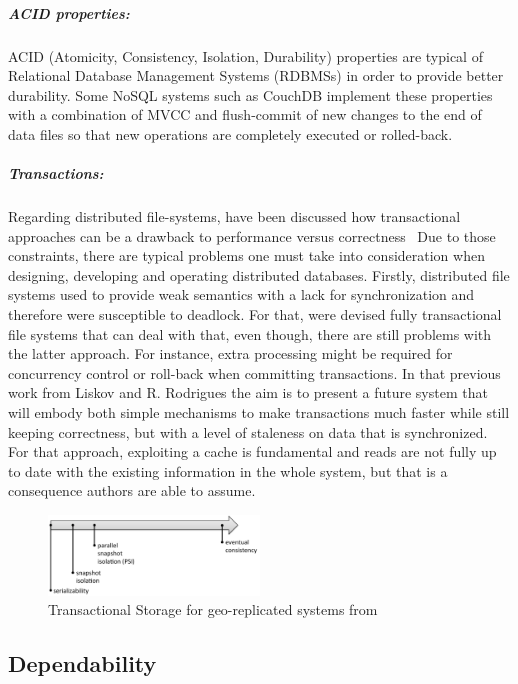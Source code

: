 		\subparagraph{ACID properties:}
		ACID (Atomicity, Consistency, Isolation, Durability) properties are typical of Relational Database Management Systems (RDBMSs) in order to provide better durability. Some NoSQL systems such as CouchDB implement these properties with a combination of MVCC and flush-commit of new changes to the end of data files so that new operations are completely executed or rolled-back.

		\subparagraph{Transactions:}
		Regarding distributed file-systems, have been discussed how transactional approaches can be a drawback to performance versus correctness~\cite{Liskov:2004} Due to those constraints, there are typical problems one must take into consideration when designing, developing and operating distributed databases. Firstly, distributed file systems used to provide weak semantics with a lack for synchronization and therefore were susceptible to deadlock. For that, were devised fully transactional file systems that can deal with that, even though, there are still problems with the latter approach. For instance, extra processing might be required for concurrency control or roll-back when committing transactions. In that previous work from Liskov and R. Rodrigues the aim is to present a future system that will embody both simple mechanisms to make transactions much faster while still keeping correctness, but with a level of staleness on data that is synchronized. For that approach, exploiting a cache is fundamental and reads are not fully up to date with the existing information in the whole system, but that is a consequence authors are able to assume.

\begin{figure}[h]
\centering
\includegraphics[width=0.5\textwidth]{figs/consistency}
\caption{Transactional Storage for geo-replicated systems from \protect\cite{Sovran:2011}}
\end{figure}

\subsection{Dependability}
